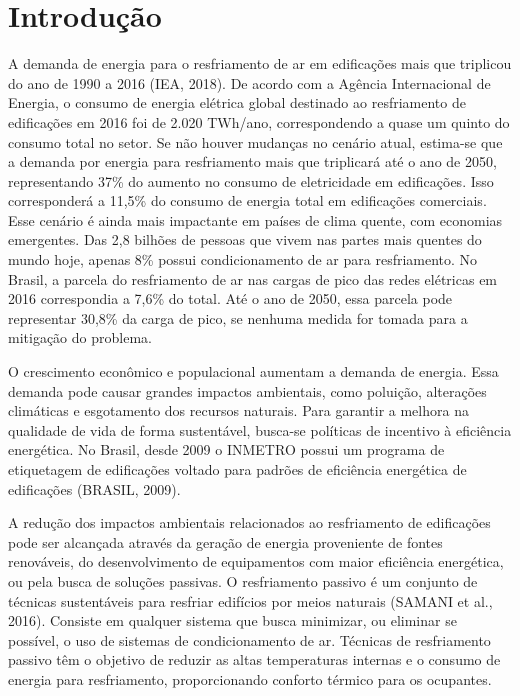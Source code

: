 \documentclass[brazil,hardcopy,openany,a5paper]{ufscthesis}
\begin{document}
	
	\frontmatter
	\folhadeaprovacao{}{} %
	\paginaresumo
	\paginaabstract
	\listadefiguras %
	\listadetabelas 
	\sumario
	\mainmatter

	\chapter{Introdução}
\label{chapter:introducao}

A demanda de energia para o resfriamento de ar em edificações mais que triplicou do ano de 1990 a 2016 (IEA, 2018). De acordo com a Agência Internacional de Energia, o consumo de energia elétrica global destinado ao resfriamento de edificações em 2016 foi de 2.020 TWh/ano, correspondendo a quase um quinto do consumo total no setor. Se não houver mudanças no cenário atual, estima-se que a demanda por energia para resfriamento mais que triplicará até o ano de 2050, representando 37\% do aumento no consumo de eletricidade em edificações. Isso corresponderá a 11,5\% do consumo de energia total em edificações comerciais. Esse cenário é ainda mais impactante em países de clima quente, com economias emergentes. Das 2,8 bilhões de pessoas que vivem nas partes mais quentes do mundo hoje, apenas 8\% possui condicionamento de ar para resfriamento. No Brasil, a parcela do resfriamento de ar nas cargas de pico das redes elétricas em 2016 correspondia a 7,6\% do total. Até o ano de 2050, essa parcela pode representar 30,8\% da carga de pico, se nenhuma medida for tomada para a mitigação do problema.

O crescimento econômico e populacional aumentam a demanda de energia. Essa demanda pode causar grandes impactos ambientais, como poluição, alterações climáticas e esgotamento dos recursos naturais. Para garantir a melhora na qualidade de vida de forma sustentável, busca-se políticas de incentivo à eficiência energética. No Brasil, desde 2009 o INMETRO possui um programa de etiquetagem de edificações voltado para padrões de eficiência energética de edificações (BRASIL, 2009).

A redução dos impactos ambientais relacionados ao resfriamento de edificações pode ser alcançada através da geração de energia proveniente de fontes renováveis, do desenvolvimento de equipamentos com maior eficiência energética, ou pela busca de soluções passivas. O resfriamento passivo é um conjunto de técnicas sustentáveis para resfriar edifícios por meios naturais (SAMANI et al., 2016). Consiste em qualquer sistema que busca minimizar, ou eliminar se possível, o uso de sistemas de condicionamento de ar. Técnicas de resfriamento passivo têm o objetivo de reduzir as altas temperaturas internas e o consumo de energia para resfriamento, proporcionando conforto térmico para os ocupantes.
\end{document}
